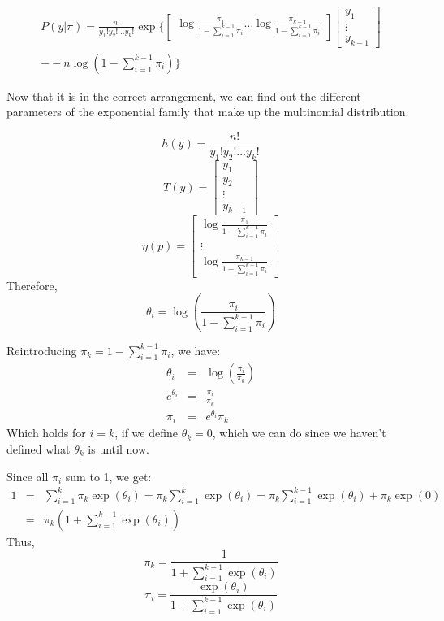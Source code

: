 \documentclass[12pt]{article}
\begin{document}
\begin{equation}
    \begin{split}
              P(y|\pi)  = \frac{n!}{y_1! y_2! \ldots y_{k}!} \exp \biggl \{   \begin{bmatrix} \log \frac{\pi_1}{1 - \sum_{i=1}^{k-1} \pi_i} \dots \log  \frac{\pi_{k-1}}{1 - \sum_{i=1}^{k-1} \pi_i} \end{bmatrix} \begin{bmatrix} y_1 \\ \vdots \\ y_{k-1} \end{bmatrix} \\ - - n\log \left(1 - \sum_{i=1}^{k-1} \pi_i \right) \biggr \}
            \end{split}
\end{equation} 


Now that it is in the correct arrangement, we can find out the different parameters of the exponential family that make up the multinomial distribution.

\[
h(y) = \frac{n!}{y_1! y_2! \ldots y_{k}!}
\]
\[
T(y) = \begin{bmatrix}
    y_1 \\ y_2 \\ \vdots \\ y_{k-1}
\end{bmatrix}
\]
\[
\eta(p) = \begin{bmatrix} 
    \log \frac{\pi_1}{1 - \sum_{i=1}^{k-1} \pi_i} \\ \vdots \\ \log \frac{\pi_{k-1}}{1 - \sum_{i=1}^{k-1} \pi_i}
\end{bmatrix} 
\]
Therefore, 
\[\theta_i = \log \left( \frac{\pi_i}{ 1 - \sum_{i=1}^{k-1} \pi_i } \right) \]

Reintroducing \(\pi_k = 1 - \sum_{i=1}^{k-1} \pi_i \), we have:
\begin{eqnarray*}
    \theta_i &=& \log \left ( \frac{\pi_i}{\pi_k} \right) \\
    e^{\theta_i} &=& \frac{\pi_i}{\pi_k} \\
    \pi_i &=& e^{\theta_i}\pi_k
\end{eqnarray*}
Which holds for \(i = k\), if we define \(\theta_k = 0\), which we can do since we haven't defined what \( \theta_k \) is until now.

Since all \(\pi_i\) sum to 1, we get:
\begin{eqnarray*}
    1 &=& \sum_{i=1}^{k} \pi_k \exp(\theta_i) =  \pi_k \sum_{i=1}^{k} \exp(\theta_i) = \pi_k \sum_{i=1}^{k-1} \exp(\theta_i) + \pi_k \exp{(0)} \\
    &=& \pi_k \left( 1 + \sum_{i=1}^{k-1} \exp(\theta_i) \right)
\end{eqnarray*}
Thus, 
\[
\pi_k = \frac{1}{1 + \sum_{i=1}^{k-1} \exp(\theta_i)}
\]
\[
\pi_i = \frac{\exp(\theta_i)}{1 + \sum_{i=1}^{k-1} \exp(\theta_i)}
\]
\end{document}
